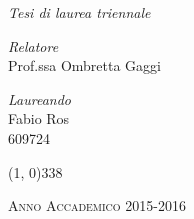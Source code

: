 \begin{titlepage}
\begin{center}
\begin{large}
\textsl{Tesi di laurea triennale}\\
\end{large}

\vspace{40pt} 

\begin{large}
\begin{flushleft}
\textit{Relatore}\\ 
\vspace{5pt} 
Prof.ssa Ombretta Gaggi
\end{flushleft}

\vspace{0pt} 

\begin{flushright}
\textit{Laureando}\\ 
\vspace{5pt} 
Fabio Ros \\
609724
\end{flushright}
\end{large}

\vspace{40pt}

\line(1, 0){338} \\
\begin{normalsize}
\textsc{Anno Accademico 2015-2016}
\end{normalsize}

\end{center}
\end{titlepage}

%